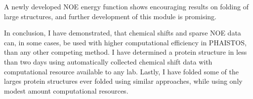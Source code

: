 A newly developed NOE energy function shows encouraging results on folding of large structures, and further development of this module is promising.


In conclusion, I have demonstrated, that chemical shifts and sparse NOE data can, in some cases, be used with higher computational efficiency in PHAISTOS, than any other competing method. I have determined a protein structure in less than two days using automatically collected chemical shift data with computational resource available to any lab.
Lastly, I have folded some of the larges protein structures ever folded using similar approaches, while using only modest amount computational resources.
